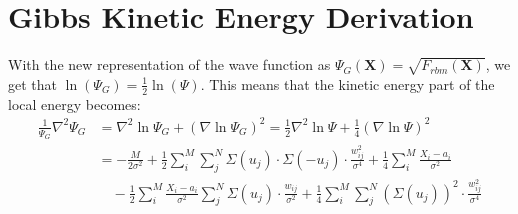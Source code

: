 \documentclass[12pt,a4paper,english]{article}
\begin{document}
\section{Gibbs Kinetic Energy Derivation}
\label{appendix:Gibbs_Ek}
With the new representation of the wave function as $\Psi_G(\textbf{X})=\sqrt{F_{rbm}(\textbf{X})}$, we get that $\ln(\Psi_G)=\frac{1}{2}\ln(\Psi)$. This means that the kinetic energy part of the local energy becomes:
\begin{align*}
\frac{1}{\Psi_G}\nabla^2\Psi_G&=\nabla^2\ln\Psi_G + (\nabla\ln\Psi_G)^2 =\frac{1}{2}\nabla^2\ln\Psi + \frac{1}{4}(\nabla\ln\Psi)^2\\
&=-\frac{M}{2\sigma^2} +\frac{1}{2}\sum_{i}^{M}\sum_{j}^{N}\Sigma(u_j)\cdot\Sigma(-u_j)\cdot\frac{w_{ij}^2}{\sigma^4} +\frac{1}{4}\sum_{i}^{M}\frac{X_i-a_i}{\sigma^2}\\ 
&\quad -\frac{1}{2}\sum_{i}^{M}\frac{X_i-a_i}{\sigma^2}\sum_{j}^{N}\Sigma(u_j)\cdot\frac{w_{ij}}{\sigma^2} 
+\frac{1}{4}\sum_{i}^{M}\sum_{j}^{N}(\Sigma(u_j))^2\cdot\frac{w_{ij}^2}{\sigma^4}
\end{align*}
\end{document}
